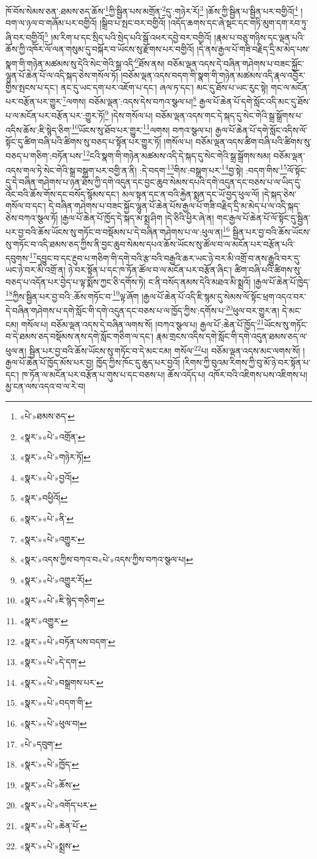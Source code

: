 ཁོ་བོས་སེམས་ཅན་:ཐམས་ཅད་ཆོས་\footnote{«པེ་»ཐམས་ཅད་}ཀྱི་སྦྱིན་པས་མགྲོན་\footnote{«སྣར་»«པེ་»འགྲོན་}དུ་:གཉེར་རོ།\footnote{«སྣར་»«པེ་»གཉེར་ཏོ།} །ཆོས་ཀྱི་སྦྱིན་པ་སྦྱིན་པར་བགྱིའོ།\footnote{«སྣར་»«པེ་»བྱའོ།} །བག་ལ་ཉལ་བ་གཞོམ་པར་བགྱིའོ། །སྒྲིབ་པ་སྤང་བར་བགྱིའོ། །འདོད་ཆགས་དང་ཞེ་སྡང་དང་གཏི་མུག་དག་རབ་ཏུ་ཞི་བར་བགྱིའོ།\footnote{«སྣར་»བཕྱིའོ།} །མ་རིག་པ་དང་སྲིད་པའི་སྲེད་པའི་སྒོ་འཕར་དབྱེ་བར་བགྱིའོ། །རྣམ་པ་བཅུ་གཉིས་དང་ལྡན་པའི་ཆོས་ཀྱི་འཁོར་ལོ་ལན་གསུམ་དུ་བསྐོར་བ་ཡོངས་སུ་རྫོགས་པར་བགྱིའོ། །དེ་ནས་རྒྱལ་པོ་གཟི་བརྗིད་དྲི་མ་མེད་པས་སྣག་གི་གཉེན་མཚམས་སུ་དེའི་སེང་གེའི་སྒྲ་འདི་\footnote{«སྣར་»«པེ་»ནི་}ཐོས་ནས། བཅོམ་ལྡན་འདས་དེ་བཞིན་གཤེགས་པ་བཟང་སྐྱོང་ལྷུན་པོ་ཆེན་པོ་ལ་འདི་སྐད་ཅེས་གསོལ་ཏོ། །བཅོམ་ལྡན་འདས་བདག་གི་སྣག་གི་གཉེན་མཚམས་འདི་རྣལ་འབྱོར་གྱིས་སྤངས་པ་དང་། ནང་དུ་ཡང་དག་པར་འཇོག་པ་དང་། ཞལ་ཏ་དང་། མང་དུ་ཐོས་པ་ཡང་རུང་སྟེ། གང་ལ་མངོན་པར་བརྩོན་པར་གྱུར་\footnote{«སྣར་»«པེ་»འགྱུར་}ལགས། བཅོམ་ལྡན་:འདས་དེས་བཀའ་སྩལ་པ།\footnote{«སྣར་»འདས་ཀྱིས་བཀའ་བ«པེ་»འདས་ཀྱིས་བཀའ་སྩལ་པ།} རྒྱལ་པོ་ཆེན་པོ་དགེ་སློང་འདི་མང་དུ་ཐོས་པ་ལ་མངོན་པར་བརྩོན་པར་:གྱུར་ཏོ།\footnote{«སྣར་»«པེ་»འགྱུར་རོ།} །དེས་གསོལ་པ། བཅོམ་ལྡན་འདས་གང་དེ་སྐད་དུ་སེང་གེའི་སྒྲ་སྒྲོགས་པ་འདིས་ཆོས་:ཇི་སྙེད་ཅིག་\footnote{«སྣར་»«པེ་»ཇི་སྙེད་གཅིག་}ཡོངས་སུ་ཐོབ་པར་གྱུར་\footnote{«སྣར་»འགྱུར་}ལགས། བཀའ་སྩལ་པ། རྒྱལ་པོ་ཆེན་པོ་དགེ་སློང་འདིས་ལོ་སྟོང་དུ་ཚིག་བཞི་པའི་ཚིགས་སུ་བཅད་པ་སྟོན་པར་གྱུར་ཏོ། །གསོལ་པ། བཅོམ་ལྡན་འདས་ཚིག་བཞི་པའི་ཚིགས་སུ་བཅད་པ་གཅིག་:བཏོན་པས་\footnote{«སྣར་»«པེ་»བཏོན་པས་བདག་}ངའི་སྣག་གི་གཉེན་མཚམས་འདི་དེ་སྐད་དུ་སེང་གེའི་སྒྲ་སྒྲོགས་སམ། བཅོམ་ལྡན་འདས་གལ་ཏེ་སེང་གེའི་སྒྲ་བསྒྲག་པར་བགྱི་ན་ནི། :དེ་བདག་\footnote{«སྣར་»«པེ་»དེ་དག་}གིས་:བསྒྲག་པར་\footnote{«སྣར་»«པེ་»བསྒྲགས་པར་}བྱ་སྟེ། :བདག་གིས་\footnote{«སྣར་»«པེ་»བདག་གི་}ལོ་སྟོང་དུ་དེ་བཞིན་གཤེགས་པ་ཉན་ཐོས་ཀྱི་དགེ་འདུན་དང་བྱང་ཆུབ་སེམས་དཔའི་དགེ་འདུན་དང་བཅས་པ་ལ་ཡིད་དུ་འོང་བའི་ཆོས་གོས་དང་བསོད་སྙོམས་དང་། མལ་སྟན་དང་ན་བའི་རྐྱེན་སྨན་དང་ཡོ་བྱད་ཕུལ་ལོ། །དེ་སྐད་ཅེས་གསོལ་བ་དང་། དེ་བཞིན་གཤེགས་པ་བཟང་སྐྱོང་ལྷུན་པོ་ཆེན་པོས་རྒྱལ་པོ་གཟི་བརྗིད་དྲི་མ་མེད་པ་ལ་འདི་སྐད་ཅེས་བཀའ་སྩལ་ཏོ། །རྒྱལ་པོ་ཆེན་པོ་ཁྱོད་དེ་སྐད་མ་སྨྲ་ཤིག །དེ་ཅིའི་ཕྱིར་ཞེ་ན། གང་རྒྱལ་པོ་ཆེན་པོ་ལོ་སྟོང་དུ་སྦྱིན་པར་བྱ་བའི་ཆོས་ཡོངས་སུ་གཏོང་བ་བསྡོམས་པ་དེ་བཞིན་གཤེགས་པ་ལ་:ཕུལ་ན།\footnote{«སྣར་»«པེ་»ཕུལ་བ།} སྦྱིན་པར་བྱ་བའི་ཆོས་ཡོངས་སུ་གཏོང་བ་འདི་ཐམས་ཅད་ཀྱིས་ནི་བྱང་ཆུབ་སེམས་དཔའ་ཆོས་ཡོངས་སུ་ཚོལ་བ་ལ་མངོན་པར་བརྩོན་པའི་དབུགས་\footnote{«པེ་»དབུག་}དབྱུང་བ་དང་རྔུབ་པ་གཅིག་གི་དགེ་བའི་རྩ་བའི་བརྒྱའི་ཆར་ཡང་ཉེ་བར་མི་འགྲོ་བ་ནས་རྒྱུའི་བར་དུ་ཡང་ཉེ་བར་མི་འགྲོ་ན། ཉེ་བར་སྟོན་པ་དང་ཁ་ཏོན་ཚོལ་བ་ལ་མངོན་པར་བརྩོན་ཞིང་། ཚིག་བཞི་པའི་ཚིགས་སུ་བཅད་པ་འདོན་པར་བྱེད་པ་ལྟ་སྨོས་ཀྱང་ཅི་དགོས་ཏེ། ང་ནི་བསོད་ནམས་དེའི་མཐའ་མི་སྨྲའོ། །རྒྱལ་པོ་ཆེན་པོ་ཁྱེད་\footnote{«སྣར་»«པེ་»ཁྱོད་}ཀྱིས་སྦྱིན་པར་བྱ་བའི་:ཆོས་གཏོང་བ་\footnote{«སྣར་»«པེ་»ཆོས་}ལྟ་ཞོག །རྒྱལ་པོ་ཆེན་པོ་འདི་ཇི་སྙམ་དུ་སེམས་ལོ་སྟོང་ཕྲག་འདའ་བར་དེ་བཞིན་གཤེགས་པ་དགེ་སློང་གི་དགེ་འདུན་དང་བཅས་པ་ལ་ཁྱོད་ཀྱིས་:དགོས་པ་\footnote{«སྣར་»«པེ་»འགོད་པར་}ཕུལ་བར་གྱུར་ན། དེ་མང་ངམ། གསོལ་པ། བཅོམ་ལྡན་འདས་དེ་བཞིན་ལགས་སོ། །བཀའ་སྩལ་པ། རྒྱལ་པོ་:ཆེན་པོ་ཁྱོད་\footnote{«སྣར་»«པེ་»ཆེན་པོ་}ཡོངས་སུ་གཏོང་བ་དེ་ཐམས་ཅད་བསྡོམས་ནས་དགེ་སློང་གཅིག་ལ་དང་། རྣམ་གྲངས་འདིས་དགེ་སློང་གི་དགེ་འདུན་ཐམས་ཅད་ལ་ཕུལ་ན། སྦྱིན་པར་བྱ་བའི་ཆོས་ཡོངས་སུ་གཏོང་བ་དེ་མང་ངམ། གསོལ་\footnote{«སྣར་»«པེ་»སྨྲས་}པ། བཅོམ་ལྡན་འདས་མང་ལགས་སོ། །རྒྱལ་པོ་ཆེན་པོ་ཁྱོད་མོས་པར་བྱ། ཁྱོད་ཀྱིས་ཁོང་དུ་ཆུད་པར་བྱའོ། །རིགས་ཀྱི་བུའམ་རིགས་ཀྱི་བུ་མོ་ཉེ་བར་སྟོན་པ་དང་། ཁ་ཏོན་ལ་མངོན་པར་བརྩོན་པ་གུས་པ་དང་བཅས་པ། ཆོས་འདོད་པ། འཁོར་བའི་འཇིགས་པས་འཇིགས་པ། མྱ་ངན་ལས་འདའ་བ་ལ་རེ་བ། 